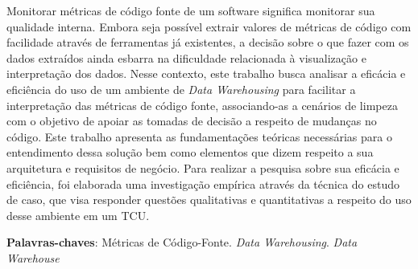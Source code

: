 \begin{resumo}

Monitorar métricas de código fonte de um software significa monitorar sua qualidade interna. Embora seja possível extrair valores de métricas de código com facilidade através de ferramentas já existentes, a decisão sobre o que fazer com os dados extraídos ainda esbarra na dificuldade relacionada à visualização e interpretação dos dados. Nesse contexto, este trabalho busca analisar a eficácia e eficiência do uso de um ambiente de \textit{Data Warehousing} para facilitar a interpretação das métricas de código fonte, associando-as a cenários de limpeza com o objetivo de apoiar as tomadas de decisão a respeito de mudanças no código. Este trabalho apresenta as fundamentações teóricas necessárias para o entendimento dessa solução bem como elementos que dizem respeito a sua arquitetura e requisitos de negócio. Para realizar a pesquisa sobre sua eficácia e eficiência, foi elaborada uma investigação empírica através da técnica do estudo de caso, que visa responder questões qualitativas e quantitativas a respeito do uso desse ambiente em um TCU.

 \vspace{\onelineskip}
    
 \noindent
 \textbf{Palavras-chaves}: Métricas de Código-Fonte. \textit{Data Warehousing}. \textit{Data Warehouse}
\end{resumo}

